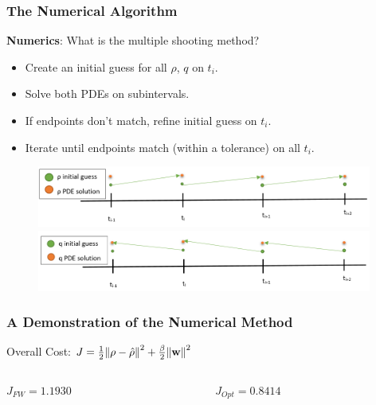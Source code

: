 \documentclass[aspectratio=169,xcolor=dvipsnames]{beamer}
\begin{document}
\begin{frame}
	\frametitle{The Numerical Algorithm}
	\textbf{Numerics}: What is the multiple shooting method?\\
   \begin{itemize}
   	\item Create an initial guess for all $\rho$, $q$ on $t_i$.
   	\item Solve both PDEs on subintervals.
   	\item If endpoints don't match, refine initial guess on $t_i$.
   	\item Iterate until endpoints match (within a tolerance) on all $t_i$.
   \end{itemize}
	\begin{figure}
		\includegraphics[width=11cm]{rhoSol.png}
	    \includegraphics[width=11cm]{qSol.png}
	\end{figure}	
\end{frame}

\begin{frame}
	\frametitle{A Demonstration of the Numerical Method}
	Overall Cost: $J = \frac{1}{2}\norm{\rho- \hat{\rho}}^2 + \frac{\beta}{2} \norm{\mathbf{w}}^2$
	\begin{columns}	
		\begin{column}{0.5\textwidth} 
			
			$J_{FW}= 1.1930$
			\begin{figure}
			\end{figure}
		\end{column}
		\begin{column}{0.5\textwidth} 
			$J_{Opt}= 0.8414$
			\begin{figure}
			\end{figure}
		\end{column}
	\end{columns}	
\end{frame}
\end{document}

